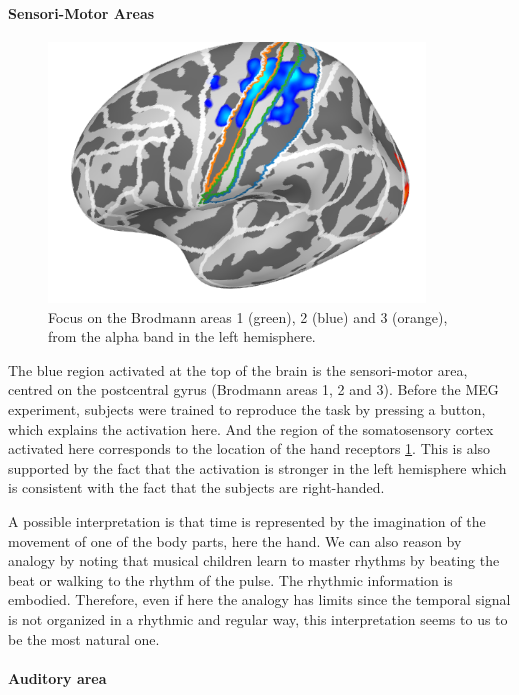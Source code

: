 \paragraph{Sensori-Motor Areas}

\begin{figure}[ht]
    \centering
    \includegraphics[width=10cm]{images_report/source/brodmann_alpha.png}
    \caption[Focus on the Brodmann areas]%
    {Focus on the Brodmann areas 1 (green), 2 (blue) and 3 (orange), from the alpha band in the left hemisphere.}
    \label{brodmann_alpha}
\end{figure}

The blue region activated at the top of the brain is the sensori-motor area, centred on the postcentral gyrus (Brodmann areas 1, 2 and 3). Before the MEG experiment, subjects were trained to reproduce the task by pressing a button, which explains the activation here. And the region of the somatosensory cortex activated here corresponds to the location of the hand receptors \ref{brodmann_alpha}. This is also supported by the fact that the activation is stronger in the left hemisphere which is consistent with the fact that the subjects are right-handed.

A possible interpretation is that time is represented by the imagination of the movement of one of the body parts, here the hand. We can also reason by analogy by noting that musical children learn to master rhythms by beating the beat or walking to the rhythm of the pulse. The rhythmic information is embodied. Therefore, even if here the analogy has limits since the temporal signal is not organized in a rhythmic and regular way, this interpretation seems to us to be the most natural one.

\paragraph{Auditory area}

